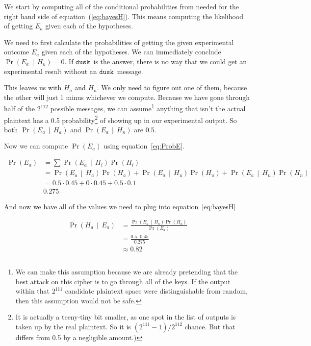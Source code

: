 \documentclass[11pt]{article}
\newcommand{\prob}[1]{\ensuremath{\operatorname{Pr}\left( #1 \right)}}
\newcommand{\condprob}[2]{\prob{#1\, \middle|\, #2}}
\newcommand\mdusk{\ensuremath{\mathtt{dusk}}}
\begin{document}
We start by computing all of the conditional probabilities from needed for the right hand side of equation~(\ref{eq:bayesH}). This means computing the likelihood of getting $E_a$ given each of the hypotheses. 

We need to first calculate the probabilities of getting the given experimental outcome $E_a$ given each of the hypotheses.
We can immediately conclude $\condprob{E_a}{H_u} = 0$.
If \mdusk\ is the answer, there is no way that we could get an experimental result without an \mdusk\ message.

This leaves us with $H_a$ and $H_n$.
We only need to figure out one of them, because the other will just 1 minus whichever we compute.
Because we have gone through half of the $2^{112}$ possible messages,
we can assume\footnote{%
    We can make this assumption because we are already pretending that the best attack on this cipher is to go through all of the keys. If the output within that $2^{111}$ candidate plaintext space were distinguishable from random, then this assumption would not be safe.
}
anything that isn't the actual plaintext has a 0.5 probability\footnote{%
    It is actually a teeny-tiny bit smaller, as one spot in the list of outputs
    is taken up by the real plaintext. So it is $(2^{111}-1)/2^{112}$ chance.
    But that differs from 0.5 by a negligible amount.)
}
of showing up in our experimental output.
So both \condprob{E_a}{H_a} and \condprob{E_a}{H_n} are 0.5.

Now we can compute \prob{E_a} using equation~\ref{eq:ProbE}.

\begin{equation}
    \begin{split}
        \prob{E_a}  &= \sum \condprob{E_a}{H_i}\prob{H_i} \\
                    &= \condprob{E_a}{H_a}\prob{H_a}
                        + \condprob{E_a}{H_u}\prob{H_u}
                        + \condprob{E_a}{H_n}\prob{H_n} \\
                    &= 0.5 \cdot 0.45 + 0 \cdot 0.45 + 0.5 \cdot 0.1 \\
                    & 0.275
    \end{split}
\end{equation}

And now we have all of the values we need to plug into equation~\ref{eq:bayesH}

\begin{equation}
    \begin{split}
        \condprob{H_a}{E_a}
            &= \frac{\condprob{E_a}{H_a}\prob{H_a}}{\prob{E_a}} \\
            &= \frac{0.5 \cdot 0.45}{0.275} \\
            &\approx 0.82
    \end{split}
\end{equation}
\end{document}

